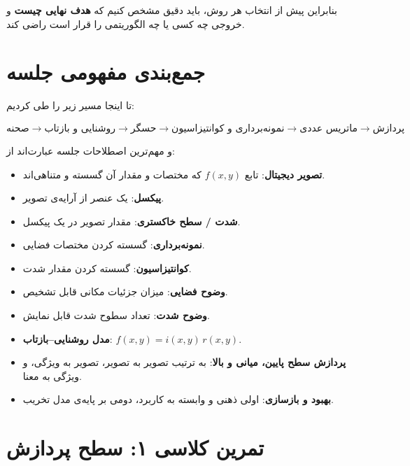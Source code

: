 \documentclass[11pt,a4paper]{article}
\begin{document}
	بنابراین پیش از انتخاب هر روش، باید دقیق مشخص کنیم که
	\textbf{هدف نهایی چیست} و خروجی چه کسی یا چه الگوریتمی را قرار است راضی کند.
	
	
	\section{جمع‌بندی مفهومی جلسه}
	
	تا اینجا مسیر زیر را طی کردیم:
	
	\[
	\boxed{
		\text{صحنه}
		\rightarrow
		\text{روشنایی و بازتاب}
		\rightarrow
		\text{حسگر}
		\rightarrow
		\text{نمونه‌برداری و کوانتیزاسیون}
		\rightarrow
		\text{ماتریس عددی}
		\rightarrow
		\text{پردازش}
	}
	\]
	
	و مهم‌ترین اصطلاحات جلسه عبارت‌اند از:
	
	\begin{itemize}
		\item \textbf{تصویر دیجیتال}:
		تابع $f(x,y)$ که مختصات و مقدار آن گسسته و متناهی‌اند.
		
		\item \textbf{پیکسل}:
		یک عنصر از آرایه‌ی تصویر.
		
		\item \textbf{شدت / سطح خاکستری}:
		مقدار تصویر در یک پیکسل.
		
		\item \textbf{نمونه‌برداری}:
		گسسته کردن مختصات فضایی.
		
		\item \textbf{کوانتیزاسیون}:
		گسسته کردن مقدار شدت.
		
		\item \textbf{وضوح فضایی}:
		میزان جزئیات مکانی قابل تشخیص.
		
		\item \textbf{وضوح شدت}:
		تعداد سطوح شدت قابل نمایش.
		
		\item \textbf{مدل روشنایی--بازتاب}:
		$f(x,y)=i(x,y)\,r(x,y)$.
		
		\item \textbf{پردازش سطح پایین، میانی و بالا}:
		به ترتیب تصویر به تصویر، تصویر به ویژگی، و ویژگی به معنا.
		
		\item \textbf{بهبود و بازسازی}:
		اولی ذهنی و وابسته به کاربرد، دومی بر پایه‌ی مدل تخریب.
	\end{itemize}
	
	
	\section{تمرین کلاسی ۱: سطح پردازش}
	
\end{document}
